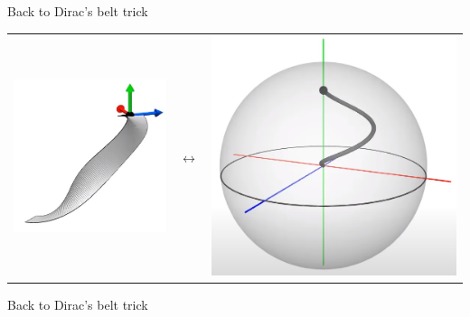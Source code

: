 \documentclass[10pt]{beamer}
\begin{document}
\begin{frame}{Back to Dirac's belt trick}
\begin{center}
\begin{tabular}{m{3cm} m{1cm} m{3cm}}
        \includegraphics[scale=0.15]{Pictures/noncontractiblepathbelt.png} & $\longleftrightarrow$ & \includegraphics[scale=0.1]{Pictures/noncontractiblepathsphere.png}
    \end{tabular}
    \end{center}
\end{frame}

\begin{frame}{Back to Dirac's belt trick}

\end{frame}
\end{document}
